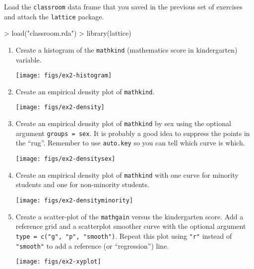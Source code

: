 \documentclass[11pt,a4rpaper]{article}
\newcommand{\code}[1]{\texttt{\small #1}}
\begin{document}
Load the \code{classroom} data frame that you saved in the previous
set of exercises and attach the \code{lattice} package.
\begin{Schunk}
\begin{Sinput}
> load("classroom.rda")
> library(lattice)
\end{Sinput}
\end{Schunk}
\begin{enumerate}
\item Create a histogram of the \code{mathkind} (mathematics score in
  kindergarten) variable.
\begin{center}
\texttt{[image: figs/ex2-histogram]}
\end{center}
\item Create an empirical density plot of \code{mathkind}.
\begin{center}
\texttt{[image: figs/ex2-density]}
\end{center}

\item Create an empirical density plot of \code{mathkind} by sex using
  the optional argument \code{groups = sex}.  It is probably a good
  idea to suppress the points in the ``rug''.  Remember to use
  \code{auto.key} so you can tell which curve is which.
\begin{center}
\texttt{[image: figs/ex2-densitysex]}
\end{center}

\item Create an empirical density plot of \code{mathkind} with one
  curve for minority students and one for non-minority students.
\begin{center}
\texttt{[image: figs/ex2-densityminority]}
\end{center}

\item Create a scatter-plot of
  the \code{mathgain} versus the kindergarten score.  Add a reference
  grid and a scatterplot smoother curve with the optional argument
  \code{type = c("g", "p", "smooth")}.  Repeat this plot using \code{"r"}
  instead of \code{"smooth"} to add a reference (or ``regression'')
  line.
\begin{center}
\texttt{[image: figs/ex2-xyplot]}
\end{center}


\end{enumerate}
\end{document}

